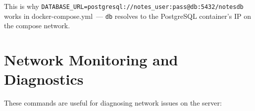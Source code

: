 \begin{codebox}[short]

\begin{Shaded}
\begin{Highlighting}[]
\KeywordTok{:}
\AttributeTok{  }\KeywordTok{:}
\AttributeTok{  }\KeywordTok{:}
\end{Highlighting}
\end{Shaded}

\end{codebox}

\noindent{}This is why \texttt{DATABASE\_}\allowbreak{}\texttt{URL=}\allowbreak{}\texttt{postgresql:}\allowbreak{}\texttt{/}\allowbreak{}\texttt{/}\allowbreak{}\texttt{notes\_}\allowbreak{}\texttt{user:}\allowbreak{}\texttt{pass@db:}\allowbreak{}\texttt{5432/}\allowbreak{}\texttt{notesdb} works in docker-compose.yml~--- \texttt{db} resolves to the PostgreSQL container's IP on the compose network.

\setcounter{section}{6}
\section{Network Monitoring and Diagnostics}\label{22-network-configuration:227-network-monitoring-and-diagnostics}

These commands are useful for diagnosing network issues on the server:

